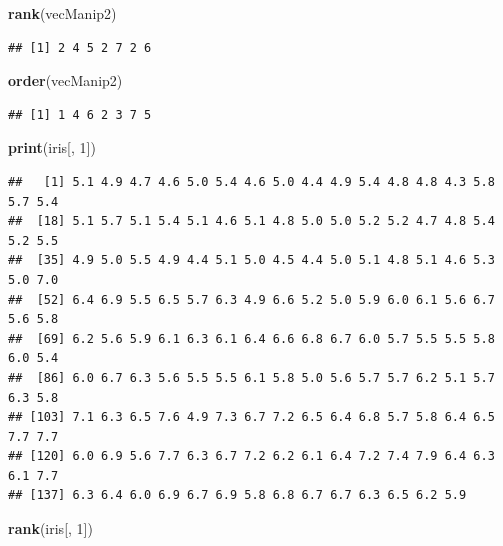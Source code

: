 \documentclass[]{book}
\newenvironment{Shaded}{\begin{snugshade}}{\end{snugshade}}
\newcommand{\DecValTok}[1]{\textcolor[rgb]{0.00,0.00,0.81}{#1}}
\newcommand{\KeywordTok}[1]{\textcolor[rgb]{0.13,0.29,0.53}{\textbf{#1}}}
\newcommand{\NormalTok}[1]{#1}
\begin{document}
\begin{Shaded}
\begin{Highlighting}[]
\KeywordTok{rank}\NormalTok{(vecManip2)}
\end{Highlighting}
\end{Shaded}

\begin{verbatim}
## [1] 2 4 5 2 7 2 6
\end{verbatim}

\begin{Shaded}
\begin{Highlighting}[]
\KeywordTok{order}\NormalTok{(vecManip2)}
\end{Highlighting}
\end{Shaded}

\begin{verbatim}
## [1] 1 4 6 2 3 7 5
\end{verbatim}

\begin{Shaded}
\begin{Highlighting}[]
\KeywordTok{print}\NormalTok{(iris[, }\DecValTok{1}\NormalTok{])}
\end{Highlighting}
\end{Shaded}

\begin{verbatim}
##   [1] 5.1 4.9 4.7 4.6 5.0 5.4 4.6 5.0 4.4 4.9 5.4 4.8 4.8 4.3 5.8 5.7 5.4
##  [18] 5.1 5.7 5.1 5.4 5.1 4.6 5.1 4.8 5.0 5.0 5.2 5.2 4.7 4.8 5.4 5.2 5.5
##  [35] 4.9 5.0 5.5 4.9 4.4 5.1 5.0 4.5 4.4 5.0 5.1 4.8 5.1 4.6 5.3 5.0 7.0
##  [52] 6.4 6.9 5.5 6.5 5.7 6.3 4.9 6.6 5.2 5.0 5.9 6.0 6.1 5.6 6.7 5.6 5.8
##  [69] 6.2 5.6 5.9 6.1 6.3 6.1 6.4 6.6 6.8 6.7 6.0 5.7 5.5 5.5 5.8 6.0 5.4
##  [86] 6.0 6.7 6.3 5.6 5.5 5.5 6.1 5.8 5.0 5.6 5.7 5.7 6.2 5.1 5.7 6.3 5.8
## [103] 7.1 6.3 6.5 7.6 4.9 7.3 6.7 7.2 6.5 6.4 6.8 5.7 5.8 6.4 6.5 7.7 7.7
## [120] 6.0 6.9 5.6 7.7 6.3 6.7 7.2 6.2 6.1 6.4 7.2 7.4 7.9 6.4 6.3 6.1 7.7
## [137] 6.3 6.4 6.0 6.9 6.7 6.9 5.8 6.8 6.7 6.7 6.3 6.5 6.2 5.9
\end{verbatim}

\begin{Shaded}
\begin{Highlighting}[]
\KeywordTok{rank}\NormalTok{(iris[, }\DecValTok{1}\NormalTok{])}
\end{Highlighting}
\end{Shaded}
\end{document}

